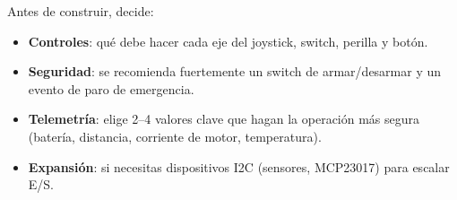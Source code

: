 Antes de construir, decide:

\begin{itemize}
    \item \textbf{Controles}: qué debe hacer cada eje del joystick, switch, perilla y botón.
    \item \textbf{Seguridad}: se recomienda fuertemente un switch de armar/desarmar y un evento de paro de emergencia.
    \item \textbf{Telemetría}: elige 2--4 valores clave que hagan la operación más segura (batería, distancia, corriente de motor, temperatura).
    \item \textbf{Expansión}: si necesitas dispositivos I2C (sensores, MCP23017) para escalar E/S.
\end{itemize}